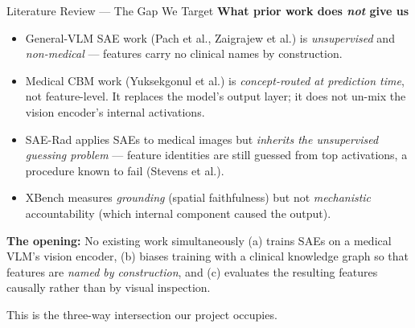 \documentclass[aspectratio=169,11pt]{beamer}
\begin{document}
\begin{frame}{Literature Review --- The Gap We Target}
    \textbf{What prior work does \emph{not} give us}

    \vspace{0.5em}
    \begin{itemize}
        \item General-VLM SAE work (Pach et al., Zaigrajew et al.) is \emph{unsupervised} and \emph{non-medical} --- features carry no clinical names by construction.

        \item Medical CBM work (Yuksekgonul et al.) is \emph{concept-routed at prediction time}, not feature-level. It replaces the model's output layer; it does not un-mix the vision encoder's internal activations.

        \item SAE-Rad applies SAEs to medical images but \emph{inherits the unsupervised guessing problem} --- feature identities are still guessed from top activations, a procedure known to fail (Stevens et al.).

        \item XBench measures \emph{grounding} (spatial faithfulness) but not \emph{mechanistic} accountability (which internal component caused the output).
    \end{itemize}

    \vspace{0.6em}
    \textcolor{accentgold}{\textbf{The opening:}} No existing work simultaneously (a) trains SAEs on a medical VLM's vision encoder, (b) biases training with a clinical knowledge graph so that features are \emph{named by construction}, and (c) evaluates the resulting features causally rather than by visual inspection.

    \vspace{0.3em}
    This is the three-way intersection our project occupies.
\end{frame}
\end{document}
